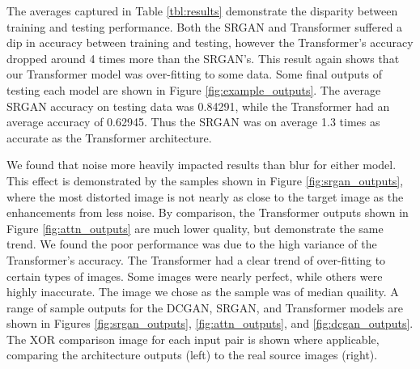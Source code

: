 \documentclass[letterpaper]{article} %
\begin{document}
The averages captured in Table \ref{tbl:results} demonstrate the disparity between training and testing performance.
Both the SRGAN and Transformer suffered a dip in accuracy between training and testing,
however the Transformer's accuracy dropped around 4 times more than the SRGAN's.
This result again shows that our Transformer model was over-fitting to some data.
Some final outputs of testing each model are shown in Figure \ref{fig:example_outputs}.
The average SRGAN accuracy on testing data was 0.84291,
while the Transformer had an average accuracy of 0.62945.
Thus the SRGAN was on average 1.3 times as accurate as the Transformer architecture.

We found that noise more heavily impacted results than blur for either model.
This effect is demonstrated by the samples shown in Figure \ref{fig:srgan_outputs},
where the most distorted image is not nearly as close to the target image as the enhancements from less noise.
By comparison, the Transformer outputs shown in Figure \ref{fig:attn_outputs}
are much lower quality, but demonstrate the same trend.
We found the poor performance was due to the high variance of the Transformer's accuracy.
The Transformer had a clear trend of over-fitting to certain types of images.
Some images were nearly perfect, while others were highly inaccurate.
The image we chose as the sample was of median quaility.
A range of sample outputs for the DCGAN, SRGAN, and Transformer models are
shown in Figures \ref{fig:srgan_outputs}, \ref{fig:attn_outputs}, and \ref{fig:dcgan_outputs}.
The XOR comparison image for each input pair is shown where applicable,
comparing the architecture outputs (left) to the real source images (right).
\end{document}
